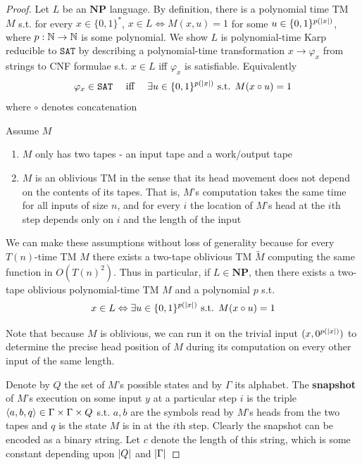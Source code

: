 \documentclass[11pt]{article}
\def \NP {\textbf{NP}}
\def \SAT {\text{SAT}}
\def \NP {\textbf{NP}}
\def \SAT {\texttt{SAT}}
\begin{document}
\begin{proof}
Let \(L\) be an \(\NP\) language. By definition, there is a polynomial time TM \(M\) s.t. for
every \(x\in\{0,1\}^*\), \(x\in L\Leftrightarrow M(x,u)=1\) for
some \(u\in\{0,1\}^{p(\abs{x})}\), where \(p:\mathbb{N}\to\mathbb{N}\) is some polynomial. We show \(L\) is
polynomial-time Karp reducible to \(\SAT\) by describing a polynomial-time
transformation \(x\to\varphi_x\) from strings to CNF formulae s.t. \(x\in L\) iff \(\varphi_x\)
is satisfiable. Equivalently
     \begin{equation*}
\varphi_x\in\SAT \quad\text{ iff }\quad\exists u\in\{0,1\}^{p(\abs{x})}
\text{ s.t. }M(x\circ u)=1
     \end{equation*}
where \(\circ\) denotes concatenation

Assume \(M\)
\begin{enumerate}
\item \(M\) only has two tapes - an input tape and a work/output tape
\item \(M\) is an oblivious TM in the sense that its head movement does not depend on the contents
of its tapes. That is, \(M\)'s computation takes the same time for all inputs of size \(n\),
and for every \(i\) the location of \(M\)'s head at the \(i\)th step depends only on \(i\)
and the length of the input
\end{enumerate}


We can make these assumptions without loss of generality because for every \(T(n)\)-time TM \(M\)
there exists a two-tape oblivious TM \(\tilde{M}\) computing the same function
in \(O(T(n)^2)\). Thus in particular, if \(L\in\NP\), then there exists a two-tape oblivious
polynomial-time TM \(M\) and a polynomial \(p\) s.t.
     \begin{equation}
     \label{eq:2.2}
x\in L \Leftrightarrow \exists u\in\{0,1\}^{p(\abs{x})}\text{ s.t. }M(x\circ u)=1
     \end{equation}

Note that because \(M\) is oblivious, we can run it on the trivial input \((x,0^{p(\abs{x})})\)
to determine the precise head position of \(M\) during its computation on every other input of
the same length.

Denote by \(Q\) the set of \(M\)'s possible states and by \(\Gamma\) its alphabet. The \textbf{snapshot}
of \(M\)'s execution on some input \(y\) at a particular step \(i\) is the triple
\(\langle a,b,q\rangle\in\Gamma\times\Gamma\times Q\) s.t. \(a,b\) are the symbols read by \(M\)'s
heads from the two tapes and \(q\) is the state \(M\) is in at the \(i\)th step. Clearly the
snapshot can be encoded as a binary string. Let \(c\) denote the length of this string, which
is some constant depending upon \(\abs{Q}\) and \(\abs{\Gamma}\)


\end{proof}
\end{document}
